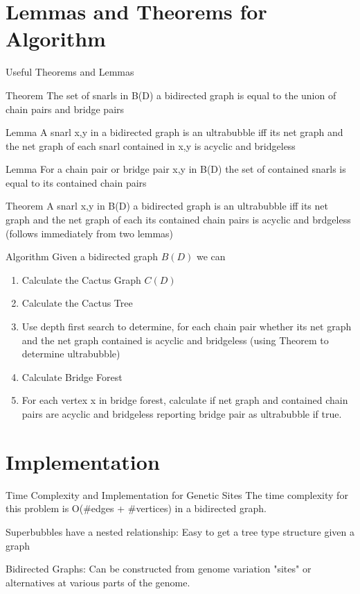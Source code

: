 \documentclass{beamer}
\begin{document}
\section{Lemmas and Theorems for Algorithm}
\begin{frame}{Useful Theorems and Lemmas}
\begin{block}{Theorem}
The set of snarls in B(D) a bidirected graph is equal to the union of chain pairs and bridge pairs
\end{block}
\begin{block}{Lemma}
A snarl {x,y} in a bidirected graph is an ultrabubble iff its net graph and the net graph of each snarl contained in {x,y} is acyclic and bridgeless
\end{block}

\begin{block}{Lemma}
For a chain pair or bridge pair {x,y} in B(D) the set of contained snarls is equal to its contained chain pairs
\end{block}
\begin{block}{Theorem}
A snarl {x,y} in B(D) a bidirected graph is an ultrabubble iff its net graph and the net graph of each its contained chain pairs is acyclic and brdgeless (follows immediately from two lemmas)
\end{block}
\end{frame}
\begin{frame}{Algorithm}
Given a bidirected graph $B(D)$ we can
\begin{enumerate}
    \item Calculate the Cactus Graph $C(D)$
    \item Calculate the Cactus Tree
    \item Use depth first search to determine, for each chain pair whether its net graph and the net graph contained is acyclic and bridgeless (using Theorem to determine ultrabubble) 
    \item Calculate Bridge Forest
    \item For each vertex x in bridge forest, calculate if net graph and contained chain pairs are acyclic and bridgeless reporting bridge pair as ultrabubble if true.
\end{enumerate}
\end{frame}

\section{Implementation}
 \begin{frame}{Time Complexity and Implementation for Genetic Sites}
     The time complexity for this problem is O(\#edges + \#vertices) in a bidirected graph. 
     
     Superbubbles have a nested relationship: Easy to get a tree type structure given a graph
     
     Bidirected Graphs: Can be constructed from genome variation "sites" or alternatives at various parts of the genome. 
\end{frame}
\end{document}
